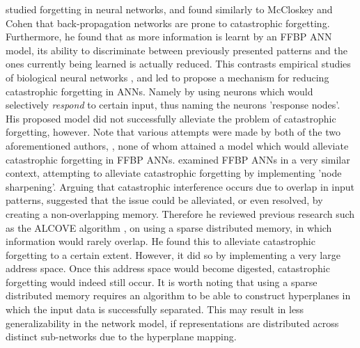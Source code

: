 \cite{Ratcliff1990} studied forgetting in neural networks, and found similarly to McCloskey and Cohen that back-propagation networks are prone to catastrophic forgetting. Furthermore, he found that as more information is learnt by an FFBP ANN model, its ability to discriminate between previously presented patterns and the ones currently being learned is actually reduced. This contrasts empirical studies of biological neural networks \citep{Ratcliff1990}, and led \cite{Ratcliff1990} to propose a mechanism for reducing catastrophic forgetting in ANNs. Namely by using neurons which would selectively \textit{respond} to certain input, thus naming the neurons 'response nodes'. His proposed model did not successfully alleviate the problem of catastrophic forgetting, however. Note that various attempts were made by both of the two aforementioned authors, \citep{McCloskey1989, Ratcliff1990}, none of whom attained a model which would alleviate catastrophic forgetting in FFBP ANNs.
\cite{French1992} examined FFBP ANNs in a very similar context, attempting to alleviate catastrophic forgetting by implementing 'node sharpening'. Arguing that catastrophic interference occurs due to overlap in input patterns, \cite{French1992} suggested that the issue could be alleviated, or even resolved, by creating a non-overlapping memory. Therefore he reviewed previous research such as the ALCOVE algorithm \citep{Kruschke1992}, on using a sparse distributed memory, in which information would rarely overlap. He found this to alleviate catastrophic forgetting to a certain extent. However, it did so by implementing a very large address space. Once this address space would become digested, catastrophic forgetting would indeed still occur. It is worth noting that using a sparse distributed memory requires an algorithm to be able to construct hyperplanes in which the input data is successfully separated. This may result in less generalizability in the network model, if representations are distributed across distinct sub-networks due to the hyperplane mapping.
